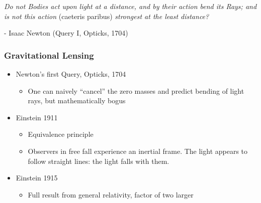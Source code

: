 \documentclass{beamer}
\begin{document}
\frame
{

    {\Large 
        {\em Do not Bodies act upon light at a distance, and by their action bend its Rays;
        and is not this action } (caeteris paribus) {\em strongest at the least distance?}
        \newline

        \hfill - Isaac Newton (Query I, Opticks, 1704)
    }
}

\frame
{
    \frametitle{Gravitational Lensing}

 
    \begin{itemize}

        \item Newton's first Query, Opticks, 1704
            \begin{itemize}
                \item One can naively ``cancel'' the zero masses and predict
                    bending of light rays, but mathematically bogus
            \end{itemize}

        \item Einstein 1911
            \begin{itemize}

                \item Equivalence principle

                \item Observers in free fall experience an inertial frame.  The
                    light appears to follow straight lines: the light falls
                    with them.

            \end{itemize}

        \item Einstein 1915
            \begin{itemize}
                \item Full result from general relativity, factor of two larger
            \end{itemize}


    \end{itemize}

}


	
\end{document}
